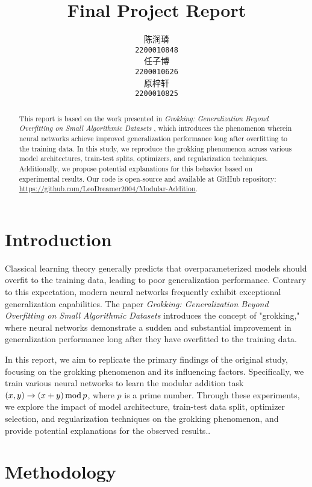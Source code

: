 \documentclass{article}
\title{Final Project Report}
\author{
    陈润璘 \\
    \texttt{2200010848} \\
    \And
    任子博 \\
    \texttt{2200010626} \\
    \And
    原梓轩 \\
    \texttt{2200010825} \\
}
\begin{document}
\maketitle

\begin{abstract}
    This report is based on the work presented in \textit{Grokking: Generalization Beyond Overfitting on Small Algorithmic Datasets} \cite{power2022grokking}, which introduces the phenomenon wherein neural networks achieve improved generalization performance long after overfitting to the training data. In this study, we reproduce the grokking phenomenon across various model architectures, train-test splits, optimizers, and regularization techniques. Additionally, we propose potential explanations for this behavior based on experimental results.  Our code is open-source and available at GitHub repository: \url{https://github.com/LeoDreamer2004/Modular-Addition}.
\end{abstract}

\section{Introduction}

Classical learning theory generally predicts that overparameterized models should overfit to the training data, leading to poor generalization performance. Contrary to this expectation, modern neural networks frequently exhibit exceptional generalization capabilities. The paper \textit{Grokking: Generalization Beyond Overfitting on Small Algorithmic Datasets} introduces the concept of "grokking," where neural networks demonstrate a sudden and substantial improvement in generalization performance long after they have overfitted to the training data.

In this report, we aim to replicate the primary findings of the original study, focusing on the grokking phenomenon and its influencing factors. Specifically, we train various neural networks to learn the modular addition task $(x, y) \rightarrow (x + y)\, {\rm mod}\, p$, where $p$ is a prime number. Through these experiments, we explore the impact of model architecture, train-test data split, optimizer selection, and regularization techniques on the grokking phenomenon, and provide potential explanations for the observed results..

\section{Methodology}
\end{document}

